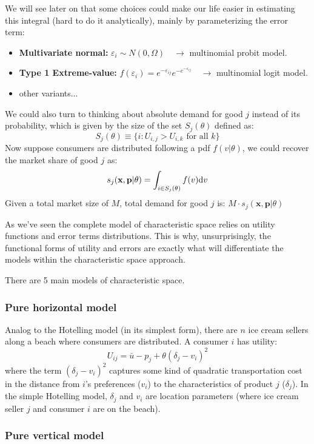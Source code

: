 We will see later on that some choices could make our life easier in estimating this integral (hard to do it analytically), mainly by parameterizing the error term:\begin{itemize}
\item \textbf{Multivariate normal:} $\varepsilon_i \sim N(0, \Omega)\quad \to $ multinomial probit model.
\item \textbf{Type 1 Extreme-value:} $f(\varepsilon_i) = e^{-\varepsilon_{ij}} e^{-e^{-\varepsilon_{ij}}} \quad \to $ multinomial logit model.
\item other variants...
\end{itemize}

We could also turn to thinking about absolute demand for good $j$ instead of its probability, which is given by the size of the set $S_j(\theta)$ defined as: $$ S_j(\theta) \equiv \{i : U_{i,j} > U_{i, k} \text{ for all } k \}$$ Now suppose consumers are distributed following a pdf $f(v\vert \theta)$, we could recover the market share of good $j$ as: $$ s_j(\mathbf{x}, \mathbf{p}\vert \theta) = \int_{i\in S_j(\theta)} f(v)\mathrm{d} v $$ Given a total market size of $M$, total demand for good $j$ is: $M\cdot s_j(\mathbf{x}, \mathbf{p}\vert \theta)$

As we've seen the complete model of characteristic space relies on utility functions and error terms distributions. This is why, unsurprisingly, the functional forms of utility and errors are exactly what will differentiate the models within the characteristic space approach.

There are 5 main models of characteristic space.

\subsubsection{Pure horizontal model}

Analog to the Hotelling model (in its simplest form), there are $n$ ice cream sellers along a beach where consumers are distributed. A consumer $i$ has utility: $$U_{ij} = \bar u - p_j + \theta(\delta_j - v_i)^2 $$ where the term $(\delta_j - v_i)^2$ captures some kind of quadratic transportation cost in the distance from $i$'s preferences ($v_i$) to the characteristics of product $j$ ($\delta_j$). In the simple Hotelling model, $\delta_j$ and $v_i$ are location parameters (where ice cream seller $j$ and consumer $i$ are on the beach).

\subsubsection{Pure vertical model}

